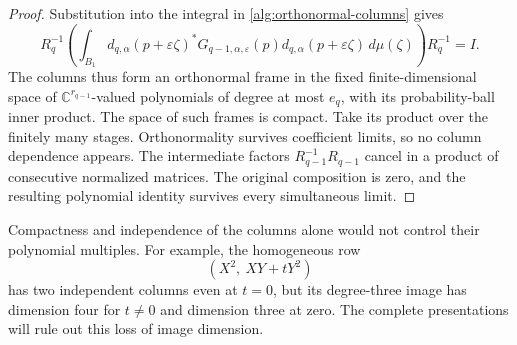 \documentclass[11pt,reqno]{amsart}
\numberwithin{equation}{section}
\theoremstyle{definition}
\theoremstyle{remark}
\begin{document}
\begin{proof}
Substitution into the integral in
\eqref{alg:orthonormal-columns} gives
\[
 R_q^{-1}
 \left(\int_{B_1}d_{q,\alpha}(p+\varepsilon\zeta)^*
 G_{q-1,\alpha,\varepsilon}(p)
 d_{q,\alpha}(p+\varepsilon\zeta)\,d\mu(\zeta)\right)
 R_q^{-1}
 =I.
\]
The columns thus form an orthonormal frame in the fixed
finite-dimensional space of \(\mathbb C^{r_{q-1}}\)-valued polynomials
of degree at most \(e_q\), with its probability-ball inner product.
The space of such frames is compact. Take its product over the finitely
many stages. Orthonormality survives coefficient limits, so no column
dependence appears. The intermediate factors \(R_{q-1}^{-1}R_{q-1}\)
cancel in a product of consecutive normalized matrices. The original
composition is zero, and the resulting polynomial identity survives
every simultaneous limit.
\end{proof}

Compactness and independence of the columns alone would not control
their polynomial multiples. For example, the homogeneous row
\[
 (X^2,\ XY+tY^2)
\]
has two independent columns even at \(t=0\), but its degree-three image
has dimension four for \(t\neq0\) and dimension three at zero. The
complete presentations will rule out this loss of image dimension.
\end{document}
